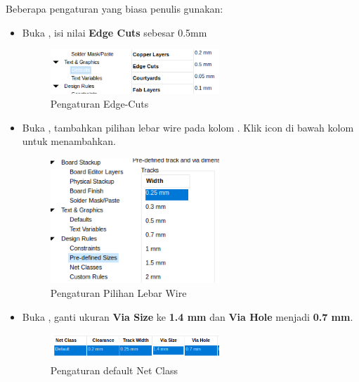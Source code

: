\documentclass[12pt]{book}
\begin{document}
	Beberapa pengaturan yang biasa penulis gunakan:
	\begin{itemize}
		\item Buka , isi nilai \textbf{Edge Cuts} sebesar 0.5mm

		\begin{figure}[!ht]
			\centering
			\includegraphics[width=0.6\textwidth]{images/pcb/pcb_set_0}
			\caption{Pengaturan Edge-Cuts}
		\end{figure}

		\item Buka , tambahkan pilihan lebar wire pada kolom .
		Klik icon \menu{+} di bawah kolom untuk menambahkan.

		\begin{figure}[!ht]
			\centering
			\includegraphics[width=0.6\textwidth]{images/pcb/pcb_set_1}
			\caption{Pengaturan Pilihan Lebar Wire}
		\end{figure}

		\item Buka , ganti ukuran \textbf{Via Size} ke \textbf{1.4 mm}
		dan \textbf{Via Hole} menjadi \textbf{0.7 mm}.

		\begin{figure}[!ht]
			\centering
			\includegraphics[width=0.6\textwidth]{images/pcb/pcb_set_2}
			\caption{Pengaturan default Net Class}
		\end{figure}
	\end{itemize}
\end{document}
